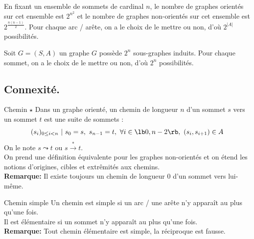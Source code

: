 \documentclass[french, 11pt]{article}
\begin{document}
\vspace*{-0.8cm}

\begin{corr}{}{}
    En fixant un ensemble de sommets de cardinal $n$, le nombre de graphes orientés sur cet ensemble est $2^{n^2}$ et le nombre de graphes non-orientés sur cet ensemble est $2^{\frac{n(n-1)}{2}}$.
    \tcblower
     Pour chaque arc / arête, on a le choix de le mettre ou non, d'où $2^{|A|}$ possibilités.
\end{corr}

\begin{prop}{}{}
    Soit $G=(S,A)$ un graphe $G$ possède $2^n$ sous-graphes induits.
    \tcblower
    Pour chaque sommet, on a le choix de le mettre ou non, d'où $2^n$ possibilités.
\end{prop}

\vspace*{-0.5cm}

\subsection{Connexité.}

\begin{defi}{Chemin $\star$}{}
    Dans un graphe orienté, un chemin de longueur $n$ d'un sommet $s$ vers un sommet $t$ est une suite de sommets :
    \begin{equation*}
        (s_i)_{0\leq i<n} ~ | ~ s_0=s, ~ s_{n-1}=t, ~ \forall i\in\lb0,n-2\rb, ~ (s_i,s_{i+1}) \in A
    \end{equation*}
    On le note $s\leadsto t$ ou $s\overset{*}{\to}t$.\\
    On prend une définition équivalente pour les graphes non-orientés et on étend les notions d'origines, cibles et extrêmités aux chemins.\\
    \textbf{Remarque:} Il existe toujours un chemin de longueur 0 d'un sommet vers lui-même.
\end{defi}

\vspace*{-0.5cm}

\begin{defi}{Chemin simple}{}
    Un chemin est simple si un arc / une arête n'y apparaît au plus qu'une fois.\\
    Il est élémentaire si un sommet n'y apparaît au plus qu'une fois.\\
    \textbf{Remarque:} Tout chemin élémentaire est simple, la réciproque est fausse.
\end{defi}
\end{document}
